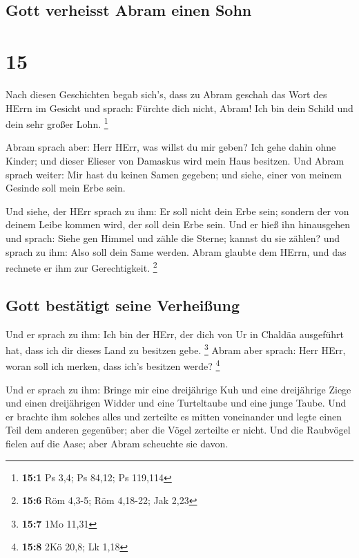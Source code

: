 \hypertarget{gott-verheisst-abram-einen-sohn}{%
\subsection{Gott verheisst Abram einen
Sohn}\label{gott-verheisst-abram-einen-sohn}}

\hypertarget{section-14}{%
\section{15}\label{section-14}}

 Nach diesen Geschichten begab sich's, dass zu Abram
geschah das Wort des HErrn im Gesicht und sprach: Fürchte dich nicht,
Abram! Ich bin dein Schild und dein sehr großer Lohn. \footnote{\textbf{15:1}
  Ps 3,4; Ps 84,12; Ps 119,114}

 Abram sprach aber: Herr HErr, was willst du mir geben?
Ich gehe dahin ohne Kinder; und dieser Elieser von Damaskus wird mein
Haus besitzen.  Und Abram sprach weiter: Mir hast du
keinen Samen gegeben; und siehe, einer von meinem Gesinde soll mein Erbe
sein.

 Und siehe, der HErr sprach zu ihm: Er soll nicht dein
Erbe sein; sondern der von deinem Leibe kommen wird, der soll dein Erbe
sein.  Und er hieß ihn hinausgehen und sprach: Siehe gen
Himmel und zähle die Sterne; kannst du sie zählen? und sprach zu ihm:
Also soll dein Same werden.  Abram glaubte dem HErrn, und
das rechnete er ihm zur Gerechtigkeit. \footnote{\textbf{15:6} Röm
  4,3-5; Röm 4,18-22; Jak 2,23}

\hypertarget{gott-bestuxe4tigt-seine-verheiuxdfung}{%
\subsection{Gott bestätigt seine
Verheißung}\label{gott-bestuxe4tigt-seine-verheiuxdfung}}

 Und er sprach zu ihm: Ich bin der HErr, der dich von Ur
in Chaldäa ausgeführt hat, dass ich dir dieses Land zu besitzen gebe.
\footnote{\textbf{15:7} 1Mo 11,31}  Abram aber sprach:
Herr HErr, woran soll ich merken, dass ich's besitzen werde? \footnote{\textbf{15:8}
  2Kö 20,8; Lk 1,18}

 Und er sprach zu ihm: Bringe mir eine dreijährige Kuh und
eine dreijährige Ziege und einen dreijährigen Widder und eine
Turteltaube und eine junge Taube.  Und er brachte ihm
solches alles und zerteilte es mitten voneinander und legte einen Teil
dem anderen gegenüber; aber die Vögel zerteilte er nicht.
 Und die Raubvögel fielen auf die Aase; aber Abram
scheuchte sie davon.


